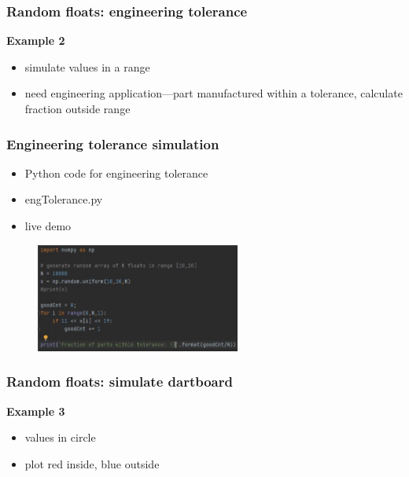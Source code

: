 \documentclass[english,14pt]{beamer}
\begin{document}

\begin{frame}[fragile]

\frametitle{Random floats: engineering tolerance}

\textbf{Example 2}\\
\vspace*{5mm}
\begin{itemize}
	\item simulate values in a range
	\item need engineering application---part manufactured within a tolerance, calculate fraction outside range
\end{itemize}

\end{frame}


\begin{frame}[fragile]

\frametitle{Engineering tolerance simulation}

\begin{itemize}
	\item Python code for engineering tolerance
	\item engTolerance.py
	\item live demo
\end{itemize}

\begin{figure}[ht]
	\centering
	\includegraphics[width=0.6\textwidth]{figures/engTolerance}
\end{figure}

\end{frame}


\begin{frame}[fragile]

\frametitle{Random floats: simulate dartboard}

\textbf{Example 3}\\
\vspace*{5mm}
\begin{itemize}
	\item values in circle
	\item plot red inside, blue outside
\end{itemize}

\end{frame}
\end{document}
